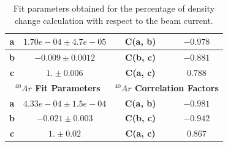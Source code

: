 \documentclass[final,5p,times,twocolumn]{elsarticle}
\begin{document}
\begin{table}[!h]
\begin{tabular}{|c|c|l|c|c|l|}
\textbf{a}              & \multicolumn{2}{c|}{$1.70e-04 \pm 4.7e-05$}                & \textbf{C(a, b)}             & \multicolumn{2}{c|}{$-0.978$} \\ \hline
\textbf{b}              & \multicolumn{2}{c|}{$-0.009 \pm 0.0012$}                   & \textbf{C(b, c)}             & \multicolumn{2}{c|}{$-0.881$} \\ \hline
\textbf{c}              & \multicolumn{2}{c|}{$1. \pm 0.006$}                        & \textbf{C(a, c)}             & \multicolumn{2}{c|}{$0.788$}  \\ \hline
\multicolumn{3}{|c|}{\textbf{$^{40}Ar$ Fit Parameters}}                              & \multicolumn{3}{c|}{\textbf{$^{40}Ar$ Correlation Factors}}  \\ \hline
\textbf{a}              & \multicolumn{2}{c|}{$4.33 e-04 \pm 1.5e-04$}               & \textbf{C(a, b)}             & \multicolumn{2}{c|}{$-0.981$} \\ \hline
\textbf{b}              & \multicolumn{2}{c|}{$-0.021 \pm 0.003$}                    & \textbf{C(b, c)}             & \multicolumn{2}{c|}{$-0.942$} \\ \hline
\textbf{c}              & \multicolumn{2}{c|}{$1. \pm 0.02$}                         & \textbf{C(a, c)}             & \multicolumn{2}{c|}{$0.867$}  \\ \hline
\end{tabular}
\caption{Fit parameters obtained for the percentage of density change calculation with respect to the beam current.}
\label{tab:fit_parameters}
\end{table}
\end{document}

